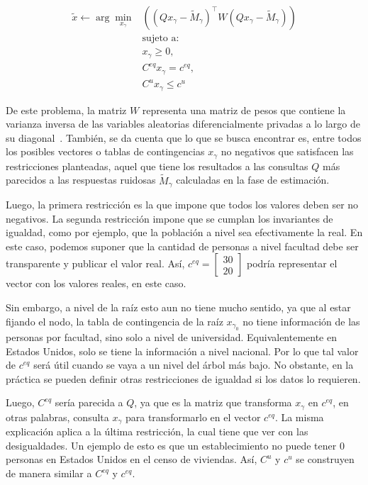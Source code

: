 \documentclass[informe]{upropuesta}
\begin{document}
\begin{equation}
    \begin{aligned}
    \tilde{x} \leftarrow \arg\min_{x_{\gamma}} &\left( (Qx_{\gamma} - \widetilde{M}_{\gamma})^\top W (Qx_{\gamma} - \widetilde{M}_{\gamma}) \right) \\
    &\text{sujeto a:} \\
    &x_{\gamma} \geq 0, \\
    &C^{eq} x_{\gamma} = c^{eq}, \\
    &C^u x_{\gamma} \leq c^u
    \end{aligned}
\end{equation}

De este problema, la matriz $W$ representa una matriz de pesos que contiene la varianza inversa de las variables aleatorias diferencialmente privadas a lo largo de su diagonal~\cite{Abowd2022}. También, se da cuenta que lo que se busca encontrar es, entre todos los posibles vectores o tablas de contingencias $x_{\gamma}$ no negativos que satisfacen las restricciones planteadas, aquel que tiene los resultados a las consultas $Q$ más parecidos a las respuestas ruidosas $\widetilde{M}_{\gamma}$ calculadas en la fase de estimación.

Luego, la primera restricción es la que impone que todos los valores deben ser no negativos. La segunda restricción impone que se cumplan los invariantes de igualdad, como por ejemplo, que la población a nivel sea efectivamente la real. En este caso, podemos suponer que la cantidad de personas a nivel facultad debe ser transparente y publicar el valor real. Así, $c^{eq} = \begin{bmatrix}
    30 \\
    20
\end{bmatrix}$ podría representar el vector con los valores reales, en este caso.

Sin embargo, a nivel de la raíz esto aun no tiene mucho sentido, ya que al estar fijando el nodo, la tabla de contingencia de la raíz $x_{\gamma_0}$ no tiene información de las personas por facultad, sino solo a nivel de universidad. Equivalentemente en Estados Unidos, solo se tiene la información a nivel nacional. Por lo que tal valor de $c^{eq}$ será útil cuando se vaya a un nivel del árbol más bajo. No obstante, en la práctica se pueden definir otras restricciones de igualdad si los datos lo requieren.

Luego, $C^{eq}$ sería parecida a $Q$, ya que es la matriz que transforma $x_{\gamma}$ en $c^{eq}$, en otras palabras, consulta $x_{\gamma}$ para transformarlo en el vector $c^{eq}$. La misma explicación aplica a la última restricción, la cual tiene que ver con las desigualdades. Un ejemplo de esto es que un establecimiento no puede tener 0 personas en Estados Unidos en el censo de viviendas. Así, $C^{u}$ y $c^u$ se construyen de manera similar a $C^{eq}$ y $c^{eq}$.
\end{document}
